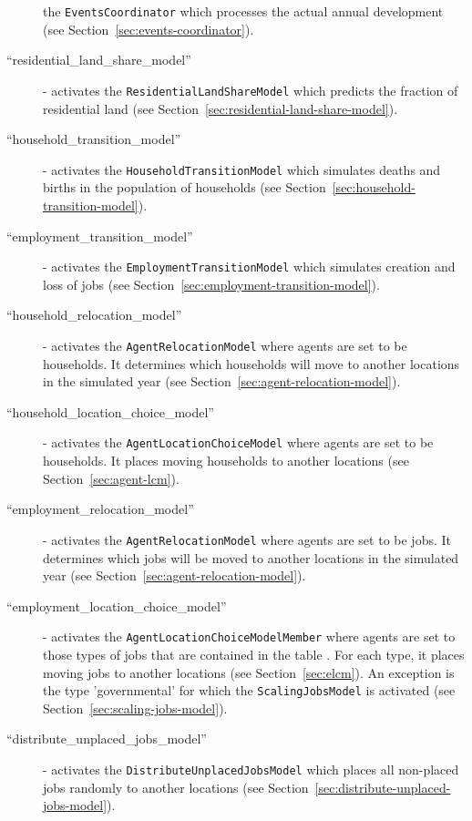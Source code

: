 \begin{description}
  the \verb|EventsCoordinator| which processes the actual annual development
  (see Section~\ref{sec:events-coordinator}).
  \item[``residential_land_share_model''] \modelsindex - activates the
  \verb|ResidentialLandShareModel| \modelsindex which predicts the fraction of residential
  land (see Section~\ref{sec:residential-land-share-model}).
  \item[``household_transition_model''] \modelsindex - activates the
  \verb|HouseholdTransitionModel| \modelsindex which simulates deaths and births in the
  population of households (see Section~\ref{sec:household-transition-model}).
  \item[``employment_transition_model''] \modelsindex - activates the
  \verb|EmploymentTransitionModel| \modelsindex which simulates creation and loss of jobs
  (see Section~\ref{sec:employment-transition-model}).
  \item[``household_relocation_model''] \modelsindex - activates the
  \verb|AgentRelocationModel| \modelsindex where agents are set to be households. It
  determines which households will move to another locations in the simulated
  year (see Section~\ref{sec:agent-relocation-model}).
  \item[``household_location_choice_model''] \modelsindex - activates the
  \verb|AgentLocationChoiceModel| \modelsindex where agents are set to be households. It
  places moving households to another locations (see
  Section~\ref{sec:agent-lcm}).
  \item[``employment_relocation_model''] \modelsindex - activates the
  \verb|AgentRelocationModel| \modelsindex where agents are set to be jobs. It determines
  which jobs will be moved to another locations in the simulated year (see
  Section~\ref{sec:agent-relocation-model}).
  \item[``employment_location_choice_model''] \modelsindex - activates the
  \verb|AgentLocationChoiceModelMember| \modelsindex where agents are set to those types of jobs
  that are contained in the table .
  For each type, it places moving jobs to another locations (see
  Section~\ref{sec:elcm}). An exception is the type 'governmental' for which the \verb|ScalingJobsModel| is activated
  (see Section~\ref{sec:scaling-jobs-model}).
  \item[``distribute_unplaced_jobs_model''] \modelsindex - activates the \verb|DistributeUnplacedJobsModel| \modelsindex which
  places  all non-placed jobs randomly to another locations (see Section~\ref{sec:distribute-unplaced-jobs-model}).
\end{description}


